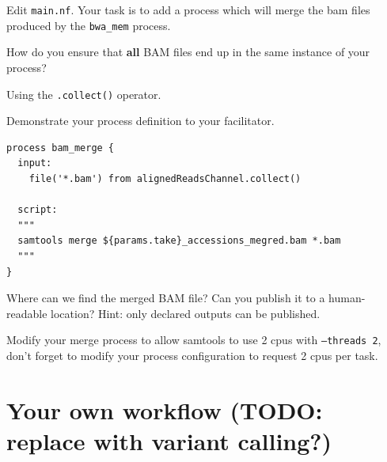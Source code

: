 \begin{steps}

Edit \texttt{main.nf}. Your task is to add a process which will merge the bam files produced by the \texttt{bwa\_mem} process. 
\begin{questions}
How do you ensure that \textbf{all} BAM files end up in the same instance of your process?
\begin{answer}
Using the \texttt{.collect()} operator.
\end{answer}
Demonstrate your process definition to your facilitator.

\begin{answer}
\begin{lstlisting}
process bam_merge {
  input:
    file('*.bam') from alignedReadsChannel.collect()

  script:
  """
  samtools merge ${params.take}_accessions_megred.bam *.bam
  """
}
\end{lstlisting}
\end{answer}
Where can we find the merged BAM file? Can you publish it to a human-readable location? Hint: only declared outputs can be published.
\end{questions}

\begin{bonus}
\begin{questions}
Modify your merge process to allow samtools to use 2 cpus with \texttt{--threads 2},
don't forget to modify your process configuration to request 2 cpus per task.
\end{questions}
\end{bonus}

%
%

\end{steps}

\section{Your own workflow (TODO: replace with variant calling?)}

